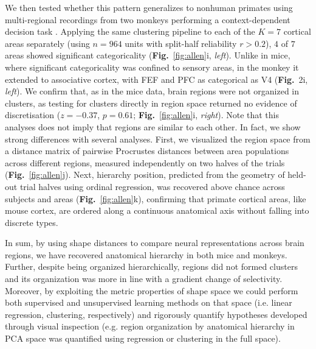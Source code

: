 We then tested whether this pattern generalizes to nonhuman primates using multi-regional recordings from two monkeys performing a context-dependent decision task \parencite{Siegel2015-cz}.  Applying the same clustering pipeline to each of the $K = 7$ cortical areas separately (using $n = 964$ units with split-half reliability $r > 0.2$), $4$ of $7$ areas showed significant categoricality (\textbf{Fig.}~\ref{fig:allen}i, \textit{left}). Unlike in mice, where significant categoricality was confined to sensory
areas, in the monkey it extended to associative cortex, with FEF and PFC as
categorical as V4 (\textbf{Fig.}~2i, \textit{left}). We confirm that, as in the mice data, brain regions were not organized in clusters, as testing for clusters directly in region space returned no evidence of discretisation ($z = -0.37$, $p = 0.61$; \textbf{Fig.}~\ref{fig:allen}i, \textit{right}). Note that this analyses does not imply that regions are similar to each other. In fact, we show strong differences with several analyses. First, we visualized the region space from a distance matrix of pairwise Procrustes distances between area populations across different regions, measured independently on two halves of the trials (\textbf{Fig.}~\ref{fig:allen}j). Next, hierarchy position, predicted from the geometry of held-out trial halves using ordinal regression, was recovered above chance across subjects and areas (\textbf{Fig.}~\ref{fig:allen}k), confirming that primate cortical areas, like mouse cortex, are ordered along a continuous anatomical axis without falling into discrete types.

In sum, by using shape distances to compare neural representations across brain regions, we have recovered anatomical hierarchy in both mice and monkeys. Further, despite being organized hierarchically, regions did not formed clusters and its organization was more in line with a gradient change of selectivity.
Moreover, by exploiting the metric properties of shape space we could perform both supervised and unsupervised learning methods on that space (i.e. linear regression, clustering, respectively) and rigorously quantify hypotheses developed through visual inspection (e.g. region organization by anatomical hierarchy in PCA space was quantified using regression or clustering in the full space).

